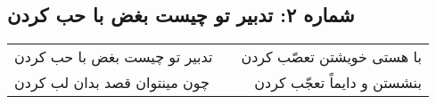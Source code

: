 \begin{center}
\section*{شماره ۲: تدبیر تو چیست بغض با حب کردن}
\label{sec:002}
\begin{longtable}{l p{0.5cm} r}
تدبیر تو چیست بغض با حب کردن
&&
با هستی خویشتن تعصّب کردن
\\
چون مینتوان قصد بدان لب کردن
&&
بنشستن و دایماً تعجّب کردن
\\
\end{longtable}
\end{center}
